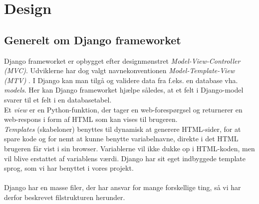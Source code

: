\documentclass[12pt]{article}
\begin{document}
\section{Design}
\label{sec:design}
\subsection{Generelt om Django frameworket}
\label{sec:genereltdjango}
Django frameworket er opbygget efter designmønstret \textit{Model-View-Controller (MVC)}\cite{mvc}. Udviklerne har dog valgt navnekonventionen \textit{Model-Template-View (MTV)} \cite{djangoFAQ}. I Django kan man tilgå og validere data fra f.eks. en database vha. \textit{models}\cite{models}. Her kan Django frameworket hjælpe således, at et felt i Django-model svarer til et felt i en databasetabel. \\
Et \textit{view}\cite{djangoView} er en Python-funktion, der tager en web-forespørgsel og returnerer en web-respons i form af HTML som kan vises til brugeren. \\
\textit{Templates} (skabeloner) benyttes til dynamisk at generere HTML-sider, for at spare kode og for nemt at kunne benytte variabelnavne, direkte i det HTML brugeren får vist i sin browser. Variablerne vil ikke dukke op i HTML-koden, men vil blive erstattet af variablens værdi. Django har sit eget indbyggede template sprog\cite{djangoTemplate}, som vi har benyttet i vores projekt.\\
\\
Django har en masse filer, der har ansvar for mange forskellige ting, så vi har derfor beskrevet filstrukturen herunder.\\
\end{document}
